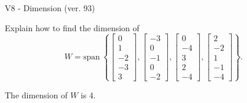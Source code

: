 \begin{exercise}
  \begin{exerciseTitle}V8 - Dimension (ver. 93)\end{exerciseTitle}
  \begin{exerciseStatement}
    Explain how to find the dimension of 
\[W=\mathrm{span}\ \left\{\left[\begin{array}{r}
0 \\
1 \\
-2 \\
-3 \\
3
\end{array}\right] , \left[\begin{array}{r}
-3 \\
0 \\
-1 \\
0 \\
-2
\end{array}\right] , \left[\begin{array}{r}
0 \\
-4 \\
3 \\
2 \\
-4
\end{array}\right] , \left[\begin{array}{r}
2 \\
-2 \\
1 \\
-1 \\
-4
\end{array}\right]\right\}.\]



  \end{exerciseStatement}
  \begin{exerciseAnswer}
   The dimension of \(W\) is  \(4\).
  


  \end{exerciseAnswer}
\end{exercise}